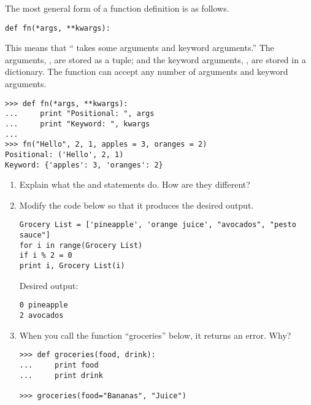 The most general form of a function definition is as follows.
\begin{lstlisting}
def fn(*args, **kwargs):
\end{lstlisting}
This means that `` takes some arguments and keyword arguments.''
The arguments, , are stored as a tuple; and the keyword arguments, , are stored in a dictionary.
The function  can accept any number of arguments and keyword arguments.
\begin{lstlisting}
>>> def fn(*args, **kwargs):
...     print "Positional: ", args
...     print "Keyword: ", kwargs
...     
>>> fn("Hello", 2, 1, apples = 3, oranges = 2)
Positional: ('Hello', 2, 1)
Keyword: {'apples': 3, 'oranges': 2}
\end{lstlisting}

\begin{problem}

\begin{enumerate}
\item Explain what the  and  statements do. How are they different?
\item Modify the code below so that it produces the desired output.
\begin{lstlisting}
Grocery List = ['pineapple', 'orange juice', "avocados", "pesto sauce"]
for i in range(Grocery List)
if i % 2 = 0
print i, Grocery List(i)
\end{lstlisting}
Desired output:
\begin{lstlisting}
0 pineapple
2 avocados
\end{lstlisting}
\item When you call the function ``groceries'' below, it returns an error. Why?
\begin{lstlisting}
>>> def groceries(food, drink):
...     print food
...     print drink    

>>> groceries(food="Bananas", "Juice")
\end{lstlisting}
\end{enumerate}
\end{problem}


\begin{comment}
\section*{Specifications}
We suggest that you submit your solutions in a file called \li{solutions.py}, using the following format.

\end{comment}